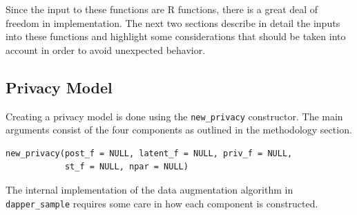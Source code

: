 Since the input to these functions are R functions, there is a great deal of freedom
in implementation. The next two sections describe in detail the inputs into
these functions and highlight some considerations that should be taken
into account in order to avoid unexpected behavior.

\hypertarget{privacy-model}{%
\subsection{Privacy Model}\label{privacy-model}}

Creating a privacy model is done using the \texttt{new\_privacy} constructor. The
main arguments consist of the four components as outlined in the methodology
section.

\begin{verbatim}
new_privacy(post_f = NULL, latent_f = NULL, priv_f = NULL,
            st_f = NULL, npar = NULL)
\end{verbatim}

The internal implementation of the data augmentation algorithm in \texttt{dapper\_sample} requires
some care in how each component is constructed.


